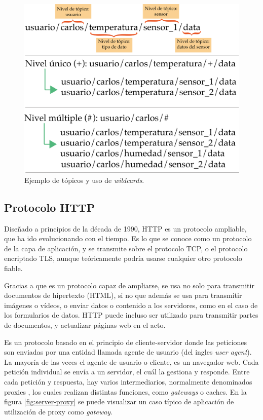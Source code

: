 \begin{figure}[htpb]
	\centering
	\includegraphics[scale=.38]{./Figures/esquema-wildcard.png}
	\caption{Ejemplo de tópicos y uso de \textit{wildcards}.}
	\label{fig:mqtt-wildcards}
\end{figure}



\subsection{Protocolo HTTP}

Diseñado a principios de la década de 1990, HTTP es un protocolo ampliable, que ha ido evolucionando con el tiempo. Es lo que se conoce como un protocolo de la capa de aplicación, y se transmite sobre el protocolo TCP, o el protocolo encriptado TLS, aunque teóricamente podría usarse cualquier otro protocolo fiable. 

Gracias a que es un protocolo capaz de ampliarse, se usa no solo para transmitir documentos de hipertexto (HTML), si no que además se usa para transmitir imágenes o vídeos, o enviar datos o contenido a los servidores, como en el caso de los formularios de datos. HTTP puede incluso ser utilizado para transmitir partes de documentos, y actualizar páginas web en el acto.

Es un protocolo basado en el principio de cliente-servidor donde las peticiones son enviadas por una entidad llamada agente de usuario (del ingles \textit{user agent}). La mayoría de las veces el agente de usuario o cliente,  es un navegador web. Cada petición individual se envía a un servidor, el cuál la gestiona y responde. Entre cada petición y respuesta, hay varios intermediarios, normalmente denominados proxies \citep{WEBSITE:18} , los cuales realizan distintas funciones, como \textit{gateways} o caches.  En la figura  \ref{fig:server-proxy} se puede visualizar un caso típico de aplicación de utilización de proxy como \textit{gateway}.

